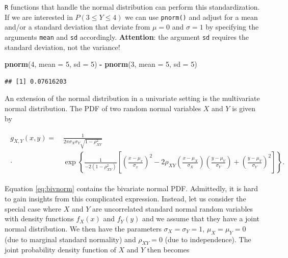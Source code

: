\documentclass[]{book}
\newenvironment{Shaded}{\begin{snugshade}}{\end{snugshade}}
\newcommand{\KeywordTok}[1]{\textcolor[rgb]{0.13,0.29,0.53}{\textbf{#1}}}
\newcommand{\DataTypeTok}[1]{\textcolor[rgb]{0.13,0.29,0.53}{#1}}
\newcommand{\DecValTok}[1]{\textcolor[rgb]{0.00,0.00,0.81}{#1}}
\newcommand{\StringTok}[1]{\textcolor[rgb]{0.31,0.60,0.02}{#1}}
\newcommand{\OperatorTok}[1]{\textcolor[rgb]{0.81,0.36,0.00}{\textbf{#1}}}
\newcommand{\NormalTok}[1]{#1}
\theoremstyle{definition}
\theoremstyle{definition}
\theoremstyle{definition}
\theoremstyle{remark}
\begin{document}
\texttt{R} functions that handle the normal distribution can perform
this standardization. If we are interested in \(P(3 \leq Y \leq 4)\) we
can use \texttt{pnorm()} and adjust for a mean and/or a standard
deviation that deviate from \(\mu=0\) and \(\sigma = 1\) by specifying
the arguments \texttt{mean} and \texttt{sd} accordingly.
\textbf{Attention}: the argument \texttt{sd} requires the standard
deviation, not the variance!

\begin{Shaded}
\begin{Highlighting}[]
\KeywordTok{pnorm}\NormalTok{(}\DecValTok{4}\NormalTok{, }\DataTypeTok{mean =} \DecValTok{5}\NormalTok{, }\DataTypeTok{sd =} \DecValTok{5}\NormalTok{) }\OperatorTok{-}\StringTok{ }\KeywordTok{pnorm}\NormalTok{(}\DecValTok{3}\NormalTok{, }\DataTypeTok{mean =} \DecValTok{5}\NormalTok{, }\DataTypeTok{sd =} \DecValTok{5}\NormalTok{) }
\end{Highlighting}
\end{Shaded}

\begin{verbatim}
## [1] 0.07616203
\end{verbatim}

An extension of the normal distribution in a univariate setting is the
multivariate normal distribution. The PDF of two random normal variables
\(X\) and \(Y\) is given by

\begin{align}
\begin{split}
g_{X,Y}(x,y) =& \, \frac{1}{2\pi\sigma_X\sigma_Y\sqrt{1-\rho_{XY}^2}} \\ 
\cdot & \, \exp \left\{ \frac{1}{-2(1-\rho_{XY}^2)} \left[ \left( \frac{x-\mu_x}{\sigma_x} \right)^2 - 2\rho_{XY}\left( \frac{x-\mu_X}{\sigma_X} \right)\left( \frac{y-\mu_Y}{\sigma_Y} \right) + \left( \frac{y-\mu_Y}{\sigma_Y} \right)^2 \right]  \right\}.
\end{split} \label{eq:bivnorm}
\end{align}

Equation \eqref{eq:bivnorm} contains the bivariate normal PDF. Admittedly,
it is hard to gain insights from this complicated expression. Instead,
let us consider the special case where \(X\) and \(Y\) are uncorrelated
standard normal random variables with density functions \(f_X(x)\) and
\(f_Y(y)\) and we assume that they have a joint normal distribution. We
then have the parameters \(\sigma_X = \sigma_Y = 1\), \(\mu_X=\mu_Y=0\)
(due to marginal standard normality) and \(\rho_{XY}=0\) (due to
independence). The joint probability density function of \(X\) and \(Y\)
then becomes
\end{document}

